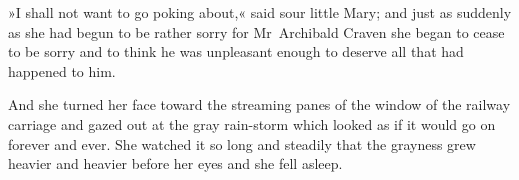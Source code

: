 »I shall not want to go poking about,« said sour little Mary; and just as suddenly as she had begun to be rather sorry for Mr~Archibald Craven she began to cease to be sorry and to think he was unpleasant enough to deserve all that had happened to him.

And she turned her face toward the streaming panes of the window of the railway carriage and gazed out at the gray rain-storm which looked as if it would go on forever and ever. She watched it so long and steadily that the grayness grew heavier and heavier before her eyes and she fell asleep.